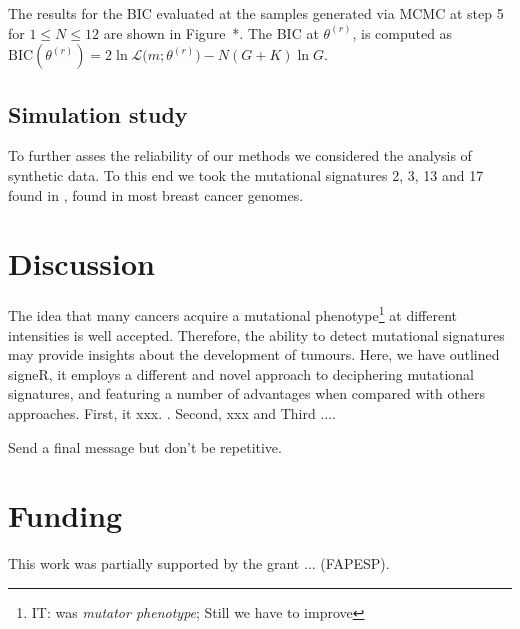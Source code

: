 \documentclass{bioinfo}
\begin{document}
The results for the BIC evaluated at the samples generated via MCMC at 
step 5 for $1 \leqslant N \leqslant 12$ are shown in Figure~*. The BIC
at $\theta^{(r)}$, is computed as
$
 \text{BIC}(\theta^{(r)}) = 2\ln\mathcal L\big(m; \theta^{(r)}\big) -
     N(G+K)\ln G.
$

\subsection{Simulation study}
To further asses the reliability of our methods we considered the
analysis of synthetic data. To this end we took the mutational
signatures 2, 3, 13 and 17 found in , found in most breast cancer genomes.


\section{Discussion}
The idea that many cancers acquire a mutational phenotype\footnote{IT:
was \emph{mutator phenotype}; Still we have to improve} at different
intensities is well accepted. Therefore, the ability to detect 
mutational signatures may provide insights about the development of
tumours. Here, we have outlined signeR, it employs a different and 
novel approach to deciphering mutational signatures, and featuring a
number of advantages when compared with others approaches. First, it
xxx. . Second, xxx and Third ....


Send a final message but don't be repetitive.


\section*{Funding}
This work was partially supported by the grant $\ldots$ (FAPESP). 
\vspace*{-12pt}
 


\end{document}
